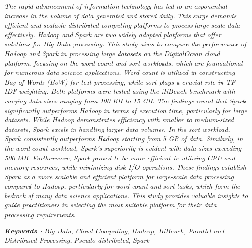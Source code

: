 \begin{abstracteng}
\justifying
\emph{The rapid advancement of information technology has led to an exponential increase in the volume of data generated and stored daily. This surge demands efficient and scalable distributed computing platforms to process large-scale data effectively. Hadoop and Spark are two widely adopted platforms that offer solutions for Big Data processing. This study aims to compare the performance of Hadoop and Spark in processing large datasets on the DigitalOcean cloud platform, focusing on the word count and sort workloads, which are foundational for numerous data science applications. Word count is utilized in constructing Bag-of-Words (BoW) for text processing, while sort plays a crucial role in TF-IDF weighting. Both platforms were tested using the HiBench benchmark with varying data sizes ranging from 100 KB to 15 GB. The findings reveal that Spark significantly outperforms Hadoop in terms of execution time, particularly for large datasets. While Hadoop demonstrates efficiency with smaller to medium-sized datasets, Spark excels in handling larger data volumes. In the sort workload, Spark consistently outperforms Hadoop starting from 5 GB of data. Similarly, in the word count workload, Spark's superiority is evident with data sizes exceeding 500 MB. Furthermore, Spark proved to be more efficient in utilizing CPU and memory resources, while minimizing disk I/O operations. These findings establish Spark as a more scalable and efficient platform for large-scale data processing compared to Hadoop, particularly for word count and sort tasks, which form the bedrock of many data science applications. This study provides valuable insights to guide practitioners in selecting the most suitable platform for their data processing requirements.}

\bigskip
\noindent
\textbf{\emph{Keywords :}} \emph{Big Data, Cloud Computing, Hadoop, HiBench, Parallel and Distributed Processing, Pseudo distributed, Spark}
\end{abstracteng}
